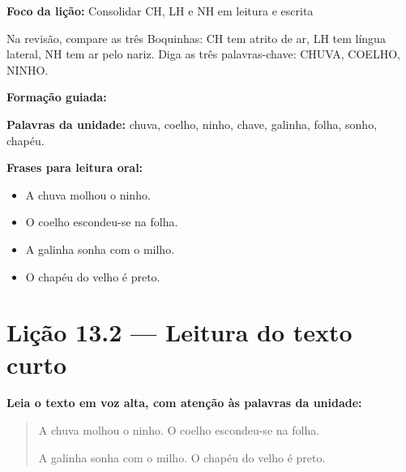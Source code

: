 \textbf{Foco da lição:} Consolidar CH, LH e NH em leitura e escrita


\begin{boquinha}
Na revisão, compare as três Boquinhas: CH tem atrito de ar, LH tem língua lateral, NH tem ar pelo nariz. Diga as três palavras-chave: CHUVA, COELHO, NINHO.
\end{boquinha}

\noindent\textbf{Formação guiada:}

\begin{center}
\end{center}

\noindent\textbf{Palavras da unidade:} chuva, coelho, ninho, chave, galinha, folha, sonho, chapéu.

\noindent\textbf{Frases para leitura oral:}
\begin{itemize}[leftmargin=1.6em]
  \item A chuva molhou o ninho.
  \item O coelho escondeu-se na folha.
  \item A galinha sonha com o milho.
  \item O chapéu do velho é preto.
\end{itemize}

\section{Lição 13.2 --- Leitura do texto curto}

\noindent\textbf{Leia o texto em voz alta, com atenção às palavras da unidade:}


\begin{quote}
A chuva molhou o ninho. O coelho escondeu-se na folha.

A galinha sonha com o milho. O chapéu do velho é preto.
\end{quote}

